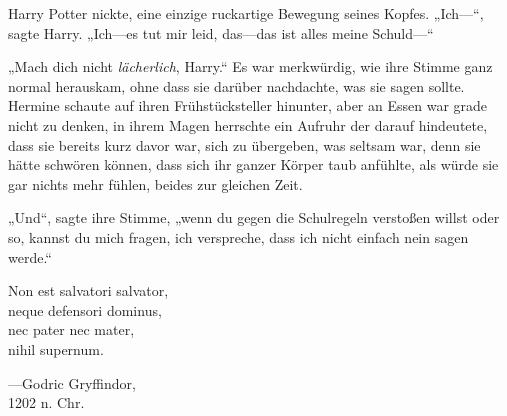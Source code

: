 Harry Potter nickte, eine einzige ruckartige Bewegung seines Kopfes. „Ich—“, sagte Harry. „Ich—es tut mir leid, das—das ist alles meine Schuld—“

„Mach dich nicht \emph{lächerlich}, Harry.“ Es war merkwürdig, wie ihre Stimme ganz normal herauskam, ohne dass sie darüber nachdachte, was sie sagen sollte. Hermine schaute auf ihren Frühstücksteller hinunter, aber an Essen war grade nicht zu denken, in ihrem Magen herrschte ein Aufruhr der darauf hindeutete, dass sie bereits kurz davor war, sich zu übergeben, was seltsam war, denn sie hätte schwören können, dass sich ihr ganzer Körper taub anfühlte, als würde sie gar nichts mehr fühlen, beides zur gleichen Zeit.

„Und“, sagte ihre Stimme, „wenn du gegen die Schulregeln verstoßen willst oder so, kannst du mich fragen, ich verspreche, dass ich nicht einfach nein sagen werde.“

\later

\begin{center}
Non est salvatori salvator,\\
neque defensori dominus,\\
nec pater nec mater,\\
nihil supernum.

—Godric Gryffindor,\\
1202 n. Chr.
\end{center}

